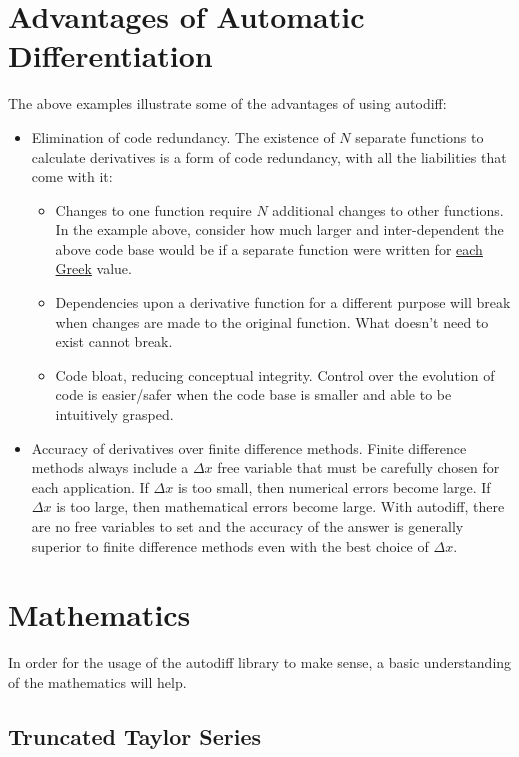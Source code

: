 \documentclass{article}
\begin{document}
\section{Advantages of Automatic Differentiation}
The above examples illustrate some of the advantages of using autodiff:
\begin{itemize}
\item Elimination of code redundancy. The existence of $N$ separate functions to calculate derivatives is a form
  of code redundancy, with all the liabilities that come with it:
  \begin{itemize}
    \item Changes to one function require $N$ additional changes to other functions. In the  example above,
        consider how much larger and inter-dependent the above code base would be if a separate function were
        written for \href{https://en.wikipedia.org/wiki/Greeks\_(finance)#Formulas\_for\_European\_option\_Greeks}
        {each Greek} value.
    \item Dependencies upon a derivative function for a different purpose will break when changes are made to
        the original function. What doesn't need to exist cannot break.
    \item Code bloat, reducing conceptual integrity. Control over the evolution of code is easier/safer when
        the code base is smaller and able to be intuitively grasped.
  \end{itemize}
\item Accuracy of derivatives over finite difference methods. Finite difference methods always include a
   $\Delta x$ free variable that must be carefully chosen for each application. If $\Delta x$ is too small, then
   numerical errors become large. If $\Delta x$ is too large, then mathematical errors become large.  With autodiff,
   there are no free variables to set and the accuracy of the answer is generally superior to finite difference
   methods even with the best choice of $\Delta x$.
\end{itemize}

\section{Mathematics}

In order for the usage of the autodiff library to make sense, a basic understanding of the mathematics will help.

\subsection{Truncated Taylor Series}
\end{document}
